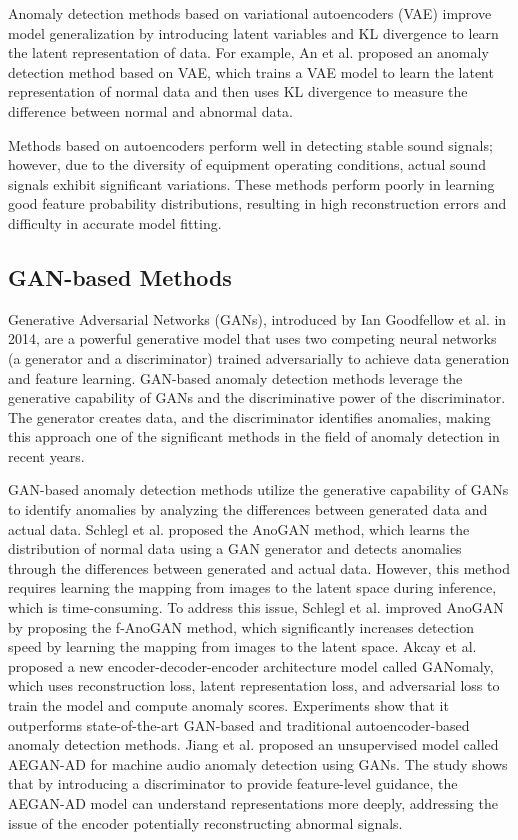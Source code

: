 \documentclass{article}
\begin{document}
Anomaly detection methods based on variational autoencoders (VAE)\cite{VAE-AD,VAE-AD-2} improve model generalization by introducing latent variables and KL divergence to learn the latent representation of data. For example, An et al.\cite{VAE-AD} proposed an anomaly detection method based on VAE, which trains a VAE model to learn the latent representation of normal data and then uses KL divergence to measure the difference between normal and abnormal data.


Methods based on autoencoders perform well in detecting stable sound signals; however, due to the diversity of equipment operating conditions, actual sound signals exhibit significant variations. These methods perform poorly in learning good feature probability distributions, resulting in high reconstruction errors and difficulty in accurate model fitting\cite{DeepLearning-4}.

\subsection{GAN-based Methods}

Generative Adversarial Networks (GANs)\cite{GAN}, introduced by Ian Goodfellow et al. in 2014, are a powerful generative model that uses two competing neural networks (a generator and a discriminator) trained adversarially to achieve data generation and feature learning. GAN-based anomaly detection methods leverage the generative capability of GANs and the discriminative power of the discriminator. The generator creates data, and the discriminator identifies anomalies, making this approach one of the significant methods in the field of anomaly detection in recent years\cite{GAN-BASED-AD-REVIEW}.

GAN-based anomaly detection methods utilize the generative capability of GANs to identify anomalies by analyzing the differences between generated data and actual data. Schlegl et al. proposed the AnoGAN\cite{AnoGAN} method, which learns the distribution of normal data using a GAN generator and detects anomalies through the differences between generated and actual data. However, this method requires learning the mapping from images to the latent space during inference, which is time-consuming. To address this issue, Schlegl et al.\cite{f-AnoGAN} improved AnoGAN by proposing the f-AnoGAN method, which significantly increases detection speed by learning the mapping from images to the latent space. Akcay et al.\cite{GANomaly} proposed a new encoder-decoder-encoder architecture model called GANomaly, which uses reconstruction loss, latent representation loss, and adversarial loss to train the model and compute anomaly scores. Experiments show that it outperforms state-of-the-art GAN-based and traditional autoencoder-based anomaly detection methods. Jiang et al.\cite{AEGAN-AD} proposed an unsupervised model called AEGAN-AD for machine audio anomaly detection using GANs. The study shows that by introducing a discriminator to provide feature-level guidance, the AEGAN-AD model can understand representations more deeply, addressing the issue of the encoder potentially reconstructing abnormal signals.
\end{document}
